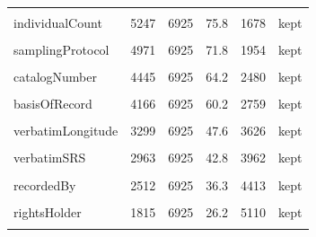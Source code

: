 \documentclass[sn-apa,pdflatex]{sn-jnl}
\begin{document}
\begin{longtable}[t]{lrrrrl}
\cellcolor{gray!10}{eventDate} & \cellcolor{gray!10}{6466} & \cellcolor{gray!10}{6925} & \cellcolor{gray!10}{93.4} & \cellcolor{gray!10}{459} & \cellcolor{gray!10}{kept}\\
individualCount & 5247 & 6925 & 75.8 & 1678 & kept\\
\addlinespace
\cellcolor{gray!10}{accessRights} & \cellcolor{gray!10}{5043} & \cellcolor{gray!10}{6925} & \cellcolor{gray!10}{72.8} & \cellcolor{gray!10}{1882} & \cellcolor{gray!10}{kept}\\
samplingProtocol & 4971 & 6925 & 71.8 & 1954 & kept\\
\cellcolor{gray!10}{locality} & \cellcolor{gray!10}{4497} & \cellcolor{gray!10}{6925} & \cellcolor{gray!10}{64.9} & \cellcolor{gray!10}{2428} & \cellcolor{gray!10}{kept}\\
catalogNumber & 4445 & 6925 & 64.2 & 2480 & kept\\
\cellcolor{gray!10}{locationRemarks} & \cellcolor{gray!10}{4396} & \cellcolor{gray!10}{6925} & \cellcolor{gray!10}{63.5} & \cellcolor{gray!10}{2529} & \cellcolor{gray!10}{kept}\\
\addlinespace
basisOfRecord & 4166 & 6925 & 60.2 & 2759 & kept\\
\cellcolor{gray!10}{verbatimLatitude} & \cellcolor{gray!10}{3461} & \cellcolor{gray!10}{6925} & \cellcolor{gray!10}{50.0} & \cellcolor{gray!10}{3464} & \cellcolor{gray!10}{kept}\\
verbatimLongitude & 3299 & 6925 & 47.6 & 3626 & kept\\
\cellcolor{gray!10}{month} & \cellcolor{gray!10}{3200} & \cellcolor{gray!10}{6925} & \cellcolor{gray!10}{46.2} & \cellcolor{gray!10}{3725} & \cellcolor{gray!10}{kept}\\
verbatimSRS & 2963 & 6925 & 42.8 & 3962 & kept\\
\addlinespace
\cellcolor{gray!10}{associatedReferences} & \cellcolor{gray!10}{2530} & \cellcolor{gray!10}{6925} & \cellcolor{gray!10}{36.5} & \cellcolor{gray!10}{4395} & \cellcolor{gray!10}{kept}\\
recordedBy & 2512 & 6925 & 36.3 & 4413 & kept\\
\cellcolor{gray!10}{eventRemarks} & \cellcolor{gray!10}{1819} & \cellcolor{gray!10}{6925} & \cellcolor{gray!10}{26.3} & \cellcolor{gray!10}{5106} & \cellcolor{gray!10}{kept}\\
rightsHolder & 1815 & 6925 & 26.2 & 5110 & kept\\
\cellcolor{gray!10}{stateProvince} & \cellcolor{gray!10}{1635} & \cellcolor{gray!10}{6925} & \cellcolor{gray!10}{23.6} & \cellcolor{gray!10}{5290} & \cellcolor{gray!10}{kept}\\

\end{longtable}
\end{document}

